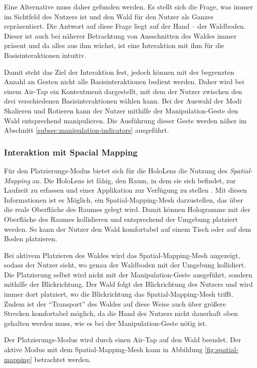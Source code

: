 Eine Alternative muss daher gefunden werden. Es stellt sich die Frage, was immer im Sichtfeld des Nutzers ist und den Wald für den Nutzer als Ganzes repräsentiert. Die Antwort auf diese Frage liegt auf der Hand -- der Waldboden. Dieser ist auch bei näherer Betrachtung von Ausschnitten des Waldes immer präsent und da alles aus ihm wächst, ist eine Interaktion mit ihm für die Basisinteraktionen intuitiv.

Damit steht das Ziel der Interaktion fest, jedoch können mit der begrenzten Anzahl an Gesten nicht alle Basisinteraktionen bedient werden. Daher wird bei einem Air-Tap ein Kontextmenü dargestellt, mit dem der Nutzer zwischen den drei verschiedenen Basisinteraktionen wählen kann. Bei der Auswahl der Modi Skalieren und Rotieren kann der Nutzer mithilfe der Manipulation-Geste den Wald entsprechend manipulieren. Die Ausführung dieser Geste werden näher im Abschnitt \ref{subsec:manipulation-indicators} ausgeführt.

\subsubsection*{Interaktion mit Spacial Mapping}
Für den Platzierungs-Modus bietet sich für die HoloLens die Nutzung des \textit{Spatial-Mapping} an. Die HoloLens ist fähig, den Raum, in dem sie sich befindet, zur Laufzeit zu erfassen und einer Applikation zur Verfügung zu stellen \cite{windows2017spacial}. Mit diesen Informationen ist es Möglich, ein Spatial-Mapping-Mesh darzustellen, das über die reale Oberfläche des Raumes gelegt wird. Damit können Hologramme mit der Oberfläche des Raumes kollidieren und entsprechend der Umgebung platziert werden. So kann der Nutzer den Wald komfortabel auf einem Tisch oder auf dem Boden platzieren.

Bei aktivem Platzieren des Waldes wird das Spatial-Mapping-Mesh angezeigt, sodass der Nutzer sieht, wo genau der Waldboden mit der Umgebung kollidiert. Die Platzierung selbst wird nicht mit der Manipulation-Geste ausgeführt, sondern mithilfe der Blickrichtung. Der Wald folgt der Blickrichtung des Nutzers und wird immer dort platziert, wo die Blickrichtung das Spatial-Mapping-Mesh trifft. Zudem ist der "`Transport"' des Waldes auf diese Weise auch über größere Strecken komfortabel möglich, da die Hand des Nutzers nicht dauerhaft oben gehalten werden muss, wie es bei der Manipulation-Geste nötig ist.

Der Platzierungs-Modus wird durch einen Air-Tap auf den Wald beendet. Der aktive Modus mit dem Spatial-Mapping-Mesh kann in Abbildung \ref{fig:spatial-mapping} betrachtet werden.


